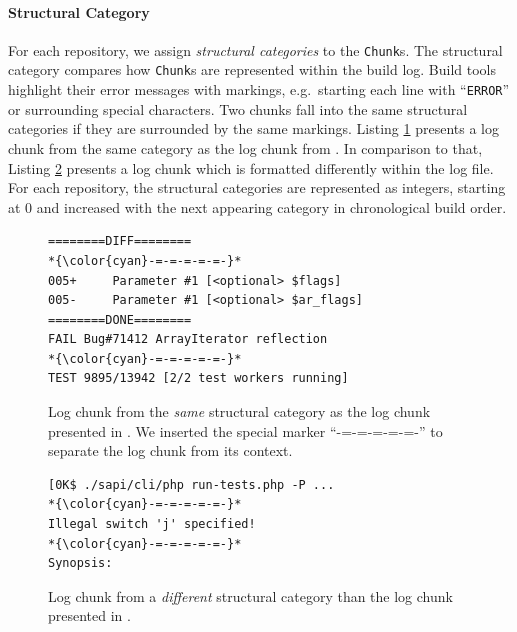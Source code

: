 \documentclass[sigconf]{acmart}
\begin{document}
\paragraph{Structural Category}
For each repository, we assign \emph{structural categories} to the \texttt{Chunk}s.
The structural category compares how \texttt{Chunk}s are represented within the build log.
Build tools highlight their error messages with markings, e.g.\ starting each line with ``\texttt{ERROR}'' or surrounding special characters.
Two chunks fall into the same structural categories if they are surrounded by the same markings.
Listing \ref{lst:same-category} presents a log chunk from the same category as the log chunk from .
In comparison to that, Listing \ref{lst:different-category} presents a log chunk which is formatted differently within the log file.
For each repository, the structural categories are represented as integers, starting at 0 and increased with the next appearing category in chronological build order.

\begin{figure}[tbp]
	\centering
\begin{lstlisting}[breaklines=true]
========DIFF========
*{\color{cyan}-=-=-=-=-=-}*
005+     Parameter #1 [<optional> $flags]
005-     Parameter #1 [<optional> $ar_flags]
========DONE========
FAIL Bug#71412 ArrayIterator reflection 
*{\color{cyan}-=-=-=-=-=-}*
TEST 9895/13942 [2/2 test workers running]
\end{lstlisting}
\vspace{-0.3cm}
	\caption{Log chunk from the \emph{same} structural category as the log chunk presented in . We inserted the special marker ``{\color{cyan}-=-=-=-=-=-}'' to separate the log chunk from its context.}
	\label{lst:same-category}
\end{figure}

\begin{figure}[tbp]
	\centering
\begin{lstlisting}[breaklines=true]
[0K$ ./sapi/cli/php run-tests.php -P ...
*{\color{cyan}-=-=-=-=-=-}*
Illegal switch 'j' specified!
*{\color{cyan}-=-=-=-=-=-}*
Synopsis:
\end{lstlisting}
\vspace{-0.3cm}
	\caption{Log chunk from a \emph{different} structural category than the log chunk presented in .}
	\label{lst:different-category}
        \vspace{-0.3cm}
\end{figure}
\end{document}
